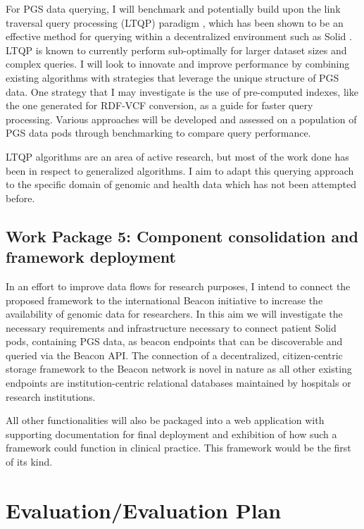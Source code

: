 \documentclass[runningheads]{llncs}
\begin{document}
For PGS data querying, I will benchmark and potentially build upon the link traversal query processing (LTQP) paradigm \cite{taelman_evaluation_2023}, which has been shown to be an effective method for querying within a decentralized environment such as Solid \cite{capadisli_solid_nodate}. 
LTQP is known to currently perform sub-optimally for larger dataset sizes and complex queries. 
I will look to innovate and improve performance by combining existing algorithms with strategies that leverage the unique structure of PGS data.
One strategy that I may investigate is the use of pre-computed indexes, like the one generated for RDF-VCF conversion, as a guide for faster query processing.
Various approaches will be developed and assessed on a population of PGS data pods through benchmarking to compare query performance. 

LTQP algorithms are an area of active research, but most of the work done has been in respect to generalized algorithms.
I aim to adapt this querying approach to the specific domain of genomic and health data which has not been attempted before. 

\subsection{Work Package 5: Component consolidation and framework deployment}

In an effort to improve data flows for research purposes, I intend to connect the proposed framework to the international Beacon initiative \cite{rambla_beacon_2022} to increase the availability of genomic data for researchers. 
In this aim we will investigate the necessary requirements and infrastructure necessary to connect patient Solid pods, containing PGS data, as beacon endpoints that can be discoverable and queried via the Beacon API. 
The connection of a decentralized, citizen-centric storage framework to the Beacon network is novel in nature as all other existing endpoints are institution-centric relational databases maintained by hospitals or research institutions.

All other functionalities will also be packaged into a web application with supporting documentation for final deployment and exhibition of how such a framework could function in clinical practice.
This framework would be the first of its kind.


\section{Evaluation/Evaluation Plan}

\end{document}
